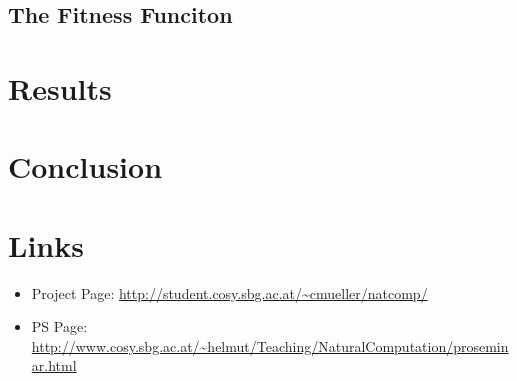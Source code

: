 \documentclass[12pt,fleqn,a4paper]{article}
\begin{document}
\subsection{The Fitness Funciton}

\section{Results}

\section{Conclusion}

\newpage



\section{Links}

\begin{itemize}
	\item Project Page: \url{http://student.cosy.sbg.ac.at/~cmueller/natcomp/}
	\item PS Page:	\url{http://www.cosy.sbg.ac.at/~helmut/Teaching/NaturalComputation/proseminar.html}
\end{itemize}




%
%
\end{document}
